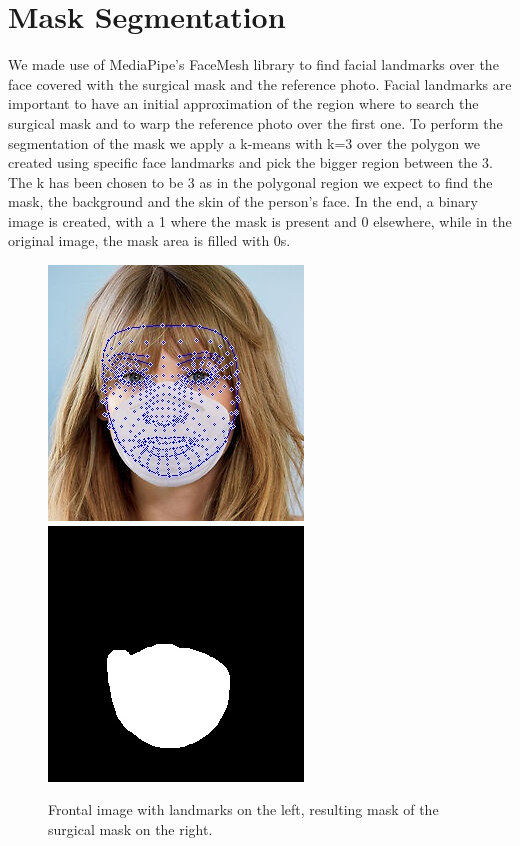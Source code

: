 \documentclass[10pt,twocolumn,letterpaper]{article}
\begin{document}
\section{Mask Segmentation}
We made use of MediaPipe's FaceMesh \cite{DBLP:journals/corr/abs-1907-06724}
library to find facial landmarks over the face covered with the surgical mask
and the reference photo. Facial landmarks are important to have an initial
approximation of the region where to search the surgical mask and to warp the
reference photo over the first one. To perform the segmentation of the mask we
apply a k-means with k=3 over the polygon we created using specific face
landmarks and pick the bigger region between the 3.  The k has been chosen to
be 3 as in the polygonal region we expect to find the mask, the background and
the skin of the person's face. In the end, a binary image is created, with a 1
where the mask is present and 0 elsewhere, while in the original image, the mask
area is filled with 0s.
\begin{figure}
  \caption{Frontal image with landmarks on the left, resulting mask of the
  surgical mask on the right.}
  \includegraphics[width=0.49\linewidth]{img/landmarks_front.jpeg}
  \includegraphics[width=0.49\linewidth]{img/dilated.jpeg}
\end{figure}
\end{document}
